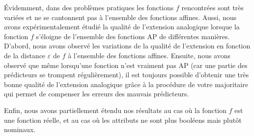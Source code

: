 Évidemment, dans des problèmes pratiques les fonctions $f$ rencontrées sont très
variées et ne se cantonnent pas à l'ensemble des fonctions affines. Aussi,
nous avons expérimentalement étudié la qualité de l'extension analogique
lorsque la fonction $f$ s'éloigne de l'ensemble des fonctions AP de différentes
manières. D'abord, nous avons observé les variations de la qualité de
l'extension en fonction de la distance $\varepsilon$ de $f$ à l'ensemble des
fonctions affines. Ensuite, nous avons observé que même lorsqu'une fonction
n'est vraiment pas AP (car une partie des prédicteurs se trompent
régulièrement), il est toujours possible d'obtenir une très bonne qualité de
l'extension analogique grâce à la procédure de votre majoritaire qui permet de
compenser les erreurs des mauvais prédicteurs.

Enfin, nous avons partiellement étendu nos résultats au cas où la fonction $f$
est une fonction réelle, et au cas où les attributs ne sont plus booléens mais
plutôt nominaux.
